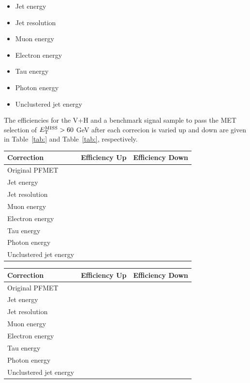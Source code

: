 \begin{itemize}
\item Jet energy
\item Jet resolution
\item Muon energy
\item Electron energy
\item Tau energy
\item Photon energy
\item Unclustered jet energy
\end{itemize}

The efficiencies for the V+H and a benchmark signal sample to pass the MET selection of $E_{\rm{T}}^{\rm{MISS}}>60$ GeV after each correcion is varied up and down are given in Table~\ref{tab:} and Table~\ref{tab:}, respectively. 

\begin{table}[htbH]
\begin{center}
\label{tab:yields}
\begin{tabular}{ l | c | c }
\hline
\hline
Correction & Efficiency Up & Efficiency Down \\
\hline
Original PFMET & & \\
\hline
Jet energy & & \\
\hline
Jet resolution & & \\
\hline
Muon energy & & \\
\hline
Electron energy & & \\
\hline
Tau energy & & \\
\hline
Photon energy & & \\
\hline
Unclustered jet energy & & \\
\hline
\hline
\end{tabular}
\end{center}
\end{table}


\begin{table}[htbH]
\begin{center}
\label{tab:yields}
\begin{tabular}{ l | c | c }
\hline
\hline
Correction & Efficiency Up & Efficiency Down \\
\hline
Original PFMET & & \\
\hline
Jet energy & & \\
\hline
Jet resolution & & \\
\hline
Muon energy & & \\
\hline
Electron energy & & \\
\hline
Tau energy & & \\
\hline
Photon energy & & \\
\hline
Unclustered jet energy & & \\
\hline
\hline
\end{tabular}
\end{center}
\end{table}

